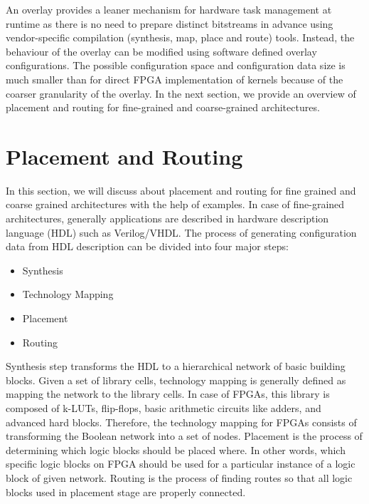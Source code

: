 An overlay provides a leaner mechanism for hardware task management at runtime as there is no need to prepare distinct bitstreams in advance using vendor-specific compilation (synthesis, map, place and route) tools. Instead, the behaviour of the overlay can be modified using software defined overlay configurations. 
The possible configuration space and configuration data size is much smaller than for direct FPGA implementation of kernels because of the coarser granularity of the overlay. 
In the next section, we provide an overview of placement and routing for fine-grained and coarse-grained architectures.



\section{Placement and Routing}
In this section, we will discuss about placement and routing for fine grained and coarse grained architectures with the help of examples.
In case of fine-grained architectures, generally applications are described in hardware description language (HDL) such as Verilog/VHDL. The process of generating configuration data from HDL description can be divided into four major steps:
\begin{itemize}\itemsep1pt \parskip0pt
	\item Synthesis
	\item Technology Mapping
	\item Placement
	\item Routing
\end{itemize}

Synthesis step transforms the HDL to a hierarchical network of basic building blocks.
Given a set of library cells, technology mapping is generally defined as mapping the network to the library cells. In case of FPGAs, this library is composed of k-LUTs, flip-flops, basic arithmetic circuits like adders, and advanced hard blocks. Therefore, the technology mapping for FPGAs consists of transforming the Boolean network into a set of nodes.
Placement is the process of determining which logic blocks should be placed where. 
In other words, which specific logic blocks on FPGA should be used for a particular instance of a logic block of given network.
Routing is the process of finding routes so that all logic blocks
used in placement stage are properly connected. 



